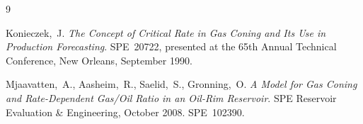 \documentclass[12pt,a4paper]{article}
\begin{document}
\begin{thebibliography}{9}

  Konieczek,~J.
  \textit{The Concept of Critical Rate in Gas Coning and Its Use in
  Production Forecasting}.
  SPE~20722, presented at the 65th Annual Technical Conference,
  New Orleans, September 1990.

  Mjaavatten,~A., Aasheim,~R., Saelid,~S., Gronning,~O.
  \textit{A Model for Gas Coning and Rate-Dependent Gas/Oil Ratio in
  an Oil-Rim Reservoir}.
  SPE Reservoir Evaluation \& Engineering, October 2008.
  SPE~102390.

\end{thebibliography}
\end{document}
